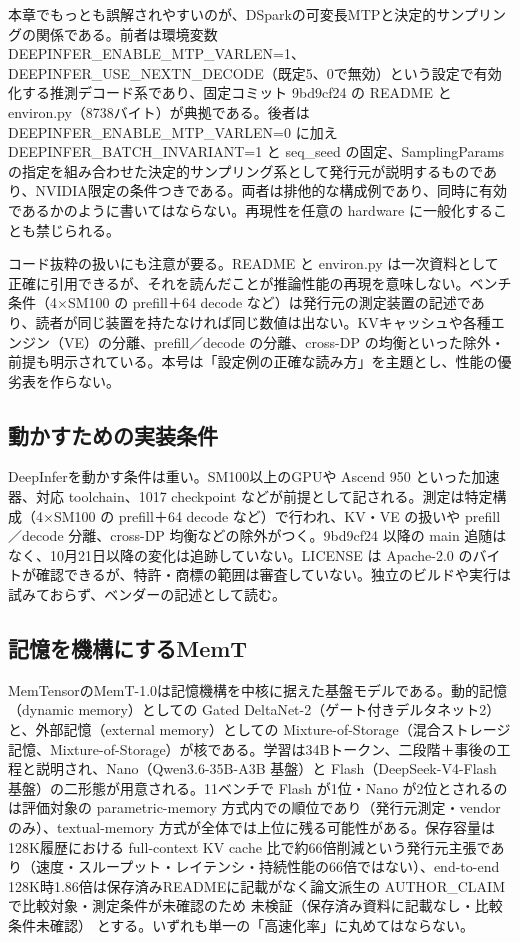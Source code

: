 \documentclass[lualatex,a4paper,10pt]{jlreq}
\begin{document}
本章でもっとも誤解されやすいのが、DSparkの可変長MTPと決定的サンプリングの関係である。前者は環境変数 DEEPINFER\_ENABLE\_MTP\_VARLEN=1、DEEPINFER\_USE\_NEXTN\_DECODE（既定5、0で無効）という設定で有効化する推測デコード系であり、固定コミット 9bd9cf24 の README と environ.py（8738バイト）が典拠である。後者は DEEPINFER\_ENABLE\_MTP\_VARLEN=0 に加え DEEPINFER\_BATCH\_INVARIANT=1 と seq\_seed の固定、SamplingParams の指定を組み合わせた決定的サンプリング系として発行元が説明するものであり、NVIDIA限定の条件つきである。両者は排他的な構成例であり、同時に有効であるかのように書いてはならない。再現性を任意の hardware に一般化することも禁じられる。


コード抜粋の扱いにも注意が要る。README と environ.py は一次資料として正確に引用できるが、それを読んだことが推論性能の再現を意味しない。ベンチ条件（4×SM100 の prefill＋64 decode など）は発行元の測定装置の記述であり、読者が同じ装置を持たなければ同じ数値は出ない。KVキャッシュや各種エンジン（VE）の分離、prefill／decode の分離、cross-DP の均衡といった除外・前提も明示されている。本号は「設定例の正確な読み方」を主題とし、性能の優劣表を作らない。


\subsection*{動かすための実装条件}


DeepInferを動かす条件は重い。SM100以上のGPUや Ascend 950 といった加速器、対応 toolchain、1017 checkpoint などが前提として記される。測定は特定構成（4×SM100 の prefill＋64 decode など）で行われ、KV・VE の扱いや prefill／decode 分離、cross-DP 均衡などの除外がつく。9bd9cf24 以降の main 追随はなく、10月21日以降の変化は追跡していない。LICENSE は Apache-2.0 のバイトが確認できるが、特許・商標の範囲は審査していない。独立のビルドや実行は試みておらず、ベンダーの記述として読む。


\subsection*{記憶を機構にするMemT}


MemTensorのMemT-1.0は記憶機構を中核に据えた基盤モデルである。動的記憶（dynamic memory）としての Gated DeltaNet-2（ゲート付きデルタネット2）と、外部記憶（external memory）としての Mixture-of-Storage（混合ストレージ記憶、Mixture-of-Storage）が核である。学習は34Bトークン、二段階＋事後の工程と説明され、Nano（Qwen3.6-35B-A3B 基盤）と Flash（DeepSeek-V4-Flash 基盤）の二形態が用意される。11ベンチで Flash が1位・Nano が2位とされるのは評価対象の parametric-memory 方式内での順位であり（発行元測定・vendorのみ）、textual-memory 方式が全体では上位に残る可能性がある。保存容量は128K履歴における full-context KV cache 比で約66倍削減という発行元主張であり（速度・スループット・レイテンシ・持続性能の66倍ではない）、end-to-end 128K時1.86倍は保存済みREADMEに記載がなく論文派生の AUTHOR\_CLAIM で比較対象・測定条件が未確認のため 未検証（保存済み資料に記載なし・比較条件未確認） とする。いずれも単一の「高速化率」に丸めてはならない。
\end{document}

